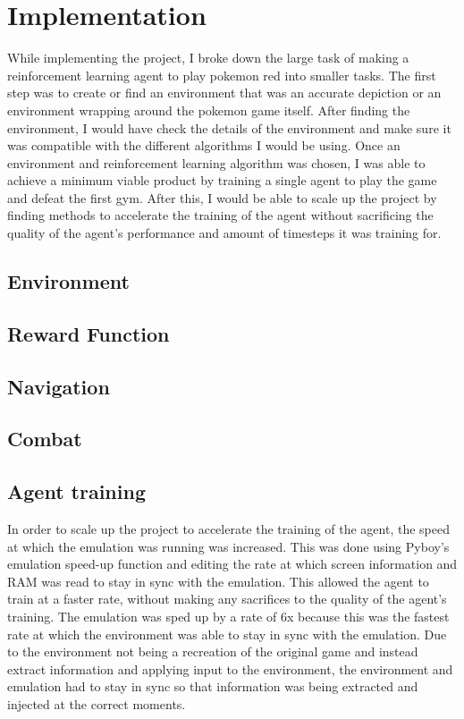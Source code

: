 \section{Implementation}

While implementing the project, I broke down the large task of making a reinforcement learning agent to play pokemon red into smaller tasks. The first step was to create or find an environment that was an accurate depiction or an environment wrapping around the pokemon game itself. After finding the environment, I would have check the details of the environment and make sure it was compatible with the different algorithms I would be using. Once an environment and reinforcement learning algorithm was chosen, I was able to achieve a minimum viable product by training a single agent to play the game and defeat the first gym. After this, I would be able to scale up the project by finding methods to accelerate the training of the agent without sacrificing the quality of the agent's performance and amount of timesteps it was training for. 

\subsection{Environment}



\subsection{Reward Function}

\subsection{Navigation}

\subsection{Combat}

\subsection{Agent training}

In order to scale up the project to accelerate the training of the agent, the speed at which the emulation was running was increased. This was done using Pyboy's emulation speed-up function and editing the rate at which screen information and RAM was read to stay in sync with the emulation. This allowed the agent to train at a faster rate, without making any sacrifices to the quality of the agent's training. The emulation was sped up by a rate of 6x because this was the fastest rate at which the environment was able to stay in sync with the emulation. Due to the environment not being a recreation of the original game and instead extract information and applying input to the environment, the environment and emulation had to stay in sync so that information was being extracted and injected at the correct moments.

